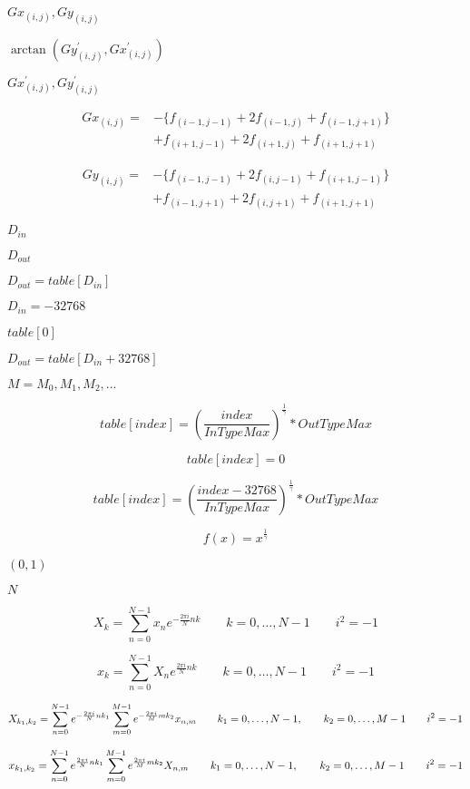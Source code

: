 \documentclass{article}
\begin{document}
$ Gx_{(i,j)} , Gy_{(i,j)} $
\pagebreak

$\arctan{ \left( Gy_{(i,j)}^{'} , Gx_{(i,j)}^{'} \right)}$
\pagebreak

$ Gx_{(i,j)}^{'} , Gy_{(i,j)}^{'} $
\pagebreak

\begin{eqnarray*} Gx_{(i,j)} = &- \{ f_{(i-1,j-1)} + 2 f_{(i-1,j)} + f_{(i-1,j+1)} \} \\ &+ f_{(i+1,j-1)} + 2 f_{(i+1,j)} + f_{(i+1,j+1)} \end{eqnarray*}
\pagebreak

\begin{eqnarray*} Gy_{(i,j)} = &- \{ f_{(i-1,j-1)} + 2 f_{(i,j-1)} + f_{(i+1,j-1)} \} \\ &+ f_{(i-1,j+1)} + 2 f_{(i,j+1)} + f_{(i+1,j+1)} \end{eqnarray*}
\pagebreak

$D_{in}$
\pagebreak

$D_{out}$
\pagebreak

$D_{out} = table[ D_{in} ]$
\pagebreak

$D_{in}=-32768$
\pagebreak

$table[0]$
\pagebreak

$D_{out} = table[ D_{in} + 32768 ]$
\pagebreak

$M={M_{0},M_{1},M_{2},...}$
\pagebreak

\[ table[ index ] = ( \frac{ index }{ InTypeMax } )^{ \frac{1}{\gamma{} } } * OutTypeMax \]
\pagebreak

\[ table[ index ] = 0 \]
\pagebreak

\[ table[ index ] = ( \frac{ index - 32768 }{ InTypeMax } )^{ \frac{ 1 }{ \gamma{} } } * OutTypeMax \]
\pagebreak

\[ f(x) = x^{ \frac{ 1 }{ \gamma{} } } \]
\pagebreak

$ (0, 1) $
\pagebreak

$ N $
\pagebreak

\[ X_k = \sum_{n=0}^{N-1} x_n e^{- \frac {2\pi i } { N } nk } \qquad k = 0,\dots,N-1 \qquad i^2 = -1 \]
\pagebreak

\[ x_k = \sum_{n=0}^{N-1} X_n e^{ \frac {2\pi i }{N} nk } \qquad k = 0,\dots,N-1 \qquad i^2 = -1 \]
\pagebreak

\[ X_{k_1, k_2} = \sum_{n=0}^{N-1} e^{-{2\pi i \over N} nk_1 } \sum_{m=0}^{M-1} e^{-{2 \pi i \over M} mk_2 } x_{n,m} \qquad k_1 = 0,\dots,N-1, \qquad k_2 = 0, \dots, M-1 \qquad i^2 = -1 \]
\pagebreak

\[ x_{k_1, k_2} = \sum_{n=0}^{N-1} e^{ {2\pi i \over N} nk_1 } \sum_{m=0}^{M-1} e^{ {2 \pi i \over M} mk_2 } X_{n,m} \qquad k_1 = 0,\dots,N-1, \qquad k_2 = 0, \dots, M-1 \qquad i^2 = -1 \]
\pagebreak
\end{document}
